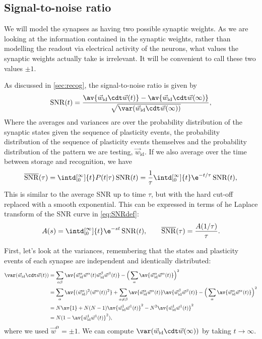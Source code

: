 \documentclass[12pt]{article}
\newcommand{\syn}{\vec{w}}
\newcommand{\synid}{\syn_\text{id}}
\DeclareMathOperator{\snr}{SNR}
\newcommand{\snrb}{\overline{\snr}}
\begin{document}
\subsection{Signal-to-noise ratio}\label{sec:snr}

We will model the synapses as having two possible synaptic weights.
As we are looking at the information contained in the synaptic weights, rather than modelling the readout via electrical activity of the neurons, what values the synaptic weights actually take is irrelevant.
It will be convenient to call these two values $\pm1$.


As discussed in \autoref{sec:recog}, the signal-to-noise ratio is given by
%
\begin{equation}\label{eq:SNRdef}
  \snr(t) = \frac{\av{\synid\cdt\syn(t)} - \av{\synid\cdt\syn(\infty)}}
     {\sqrt{\var(\synid\cdt\syn(\infty))}},
\end{equation}
%
Where the averages and variances are over the probability distribution of the synaptic states given the sequence of plasticity events, the probability distribution of the sequence of plasticity events themselves and the probability distribution of the pattern we are testing, $\synid$.
If we also average over the time between storage and recognition, we have
%
\begin{equation}\label{eq:snrb}
  \snrb(\tau) = \intd[_0^\infty]{t} P(t\vert\tau) \snr(t)
   = \frac{1}{\tau} \intd[_0^\infty]{t} \e^{-t/\tau} \snr(t),
\end{equation}
%
This is similar to the average SNR up to time $\tau$, but with the hard cut-off replaced with a smooth exponential.
This can be expressed in terms of he Laplace transform of the SNR curve in \eqref{eq:SNRdef}:
%
\begin{equation}\label{eq:laplacedef}
  A(s) = \intd[_0^\infty]{t} \e^{-st} \snr(t),
  \qquad
  \snrb(\tau) = \frac{A(1/\tau)}{\tau}.
\end{equation}
%


First, let's look at the variances, remembering that the states and plasticity events of each synapse are independent and identically distributed:
%
\begin{equation}\label{eq:noise}
\begin{aligned}
  \var(\synid\cdt\syn(t))
    &= \sum_{\alpha\beta} \av{\synid^\alpha \syn^\alpha(t) \synid^\beta \syn^\beta(t)}
    - \Big(\sum_{\alpha} \av{\synid^\alpha \syn^\alpha(t)} \Big)^2 \\
    &= \sum_{\alpha} \av{(\synid^\alpha)^2(\syn^\alpha(t))^2}
    + \sum_{\alpha\neq\beta} \av{\synid^\alpha\syn^\alpha(t)}\av{\smash{\synid^\beta}\smash{\syn^\beta}(t)}
    - \Big(\sum_{\alpha} \av{\synid^\alpha \syn^\alpha(t)} \Big)^2  \\
    &= N\av{1}
    + N(N-1)\av{\synid^1 \syn^1(t)}^2
    - N^2\av{\synid^1 \syn^1(t)}^2 \\
    &= N(1-\av{\synid^1 \syn^1(t)}^2),
\end{aligned}
\end{equation}
%
where we used $\syn^\alpha=\pm1$.
We can compute $\var(\synid\cdt\syn(\infty))$ by taking $t\to\infty$.
\end{document}
